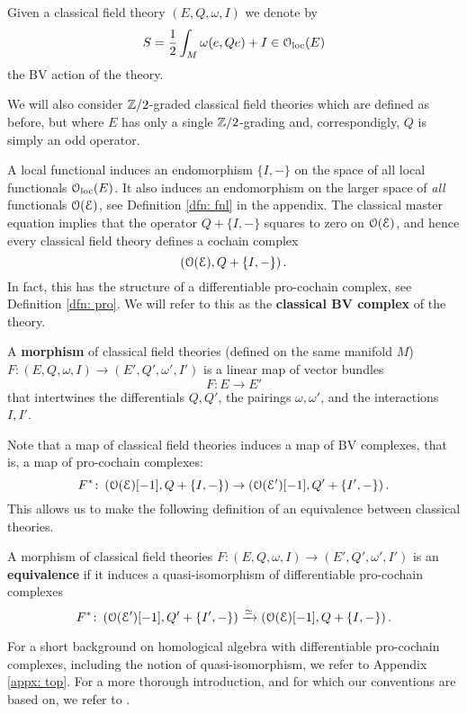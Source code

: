 \documentclass[10pt, oneside]{article}
\begin{document}
Given a classical field theory $(E, Q, \omega, I)$ we denote by
\[S = \frac{1}{2} \int_M \omega(e, Q e) + I\in \mathcal{O}_{\rm loc}(E)\]
the BV action of the theory.

\begin{remark}
We will also consider $\mathbb Z/2$-graded classical field theories which are defined as before, but where $E$ has only a single $\mathbb Z/2$-grading and, correspondigly, $Q$ is simply an odd operator.
\end{remark}

A local functional induces an endomorphism $\{I,-\}$ on the space of all local functionals $\mathcal{O}_{\rm loc}(E)$. 
It also induces an endomorphism on the larger space of {\em all} functionals $\mathcal O(\mathcal E)$, see Definition \ref{dfn: fnl} in the appendix. 
The classical master equation implies that the operator $Q + \{I,-\}$ squares to zero on $\mathcal O(\mathcal E)$, and hence every classical field theory defines a cochain complex
\[
\left(\mathcal O(\mathcal E), Q + \{I,-\}\right) .
\]
In fact, this has the structure of a differentiable pro-cochain complex, see Definition \ref{dfn: pro}. 
We will refer to this as the {\bf classical BV complex} of the theory. 

\begin{dfn}
A {\bf morphism} of classical field theories (defined on the same manifold $M$) $F\colon (E, Q, \omega, I) \to (E', Q', \omega', I')$ is a linear map of vector bundles
\[
F\colon E \to E'
\]
that intertwines the differentials $Q, Q'$, the pairings $\omega, \omega'$, and the interactions $I,I'$. 
\end{dfn}

Note that a map of classical field theories induces a map of BV complexes, that is, a map of pro-cochain complexes:
\[
F^*\colon \left(\mathcal O (\mathcal E)[-1], Q + \{I,-\} \right) \to \left(\mathcal O (\mathcal E')[-1], Q' + \{I',-\} \right) .
\]
This allows us to make the following definition of an equivalence between classical theories. 

\begin{dfn} \label{equivalence_def}
A morphism of classical field theories $F\colon (E, Q, \omega, I) \to (E', Q', \omega', I')$ is an {\bf equivalence} if it induces a quasi-isomorphism of differentiable pro-cochain complexes
\[
F^* \colon  \left(\mathcal O(\mathcal E')[-1], Q' + \{I',-\} \right) \xrightarrow{\simeq} \left(\mathcal O(\mathcal E)[-1], Q + \{I,-\} \right) .
\]
\end{dfn}

For a short background on homological algebra with differentiable pro-cochain complexes, including the notion of quasi-isomorphism, we refer to Appendix \ref{appx: top}.
For a more thorough introduction, and for which our conventions are based on, we refer to \cite{CG1}. 
\end{document}
